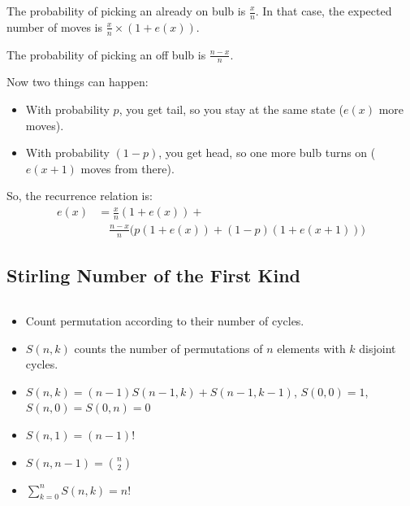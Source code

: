 {\begin{itemize}
{    The probability of picking an already on bulb is $\frac{x}{n}$.
    In that case, the expected number of moves is $\frac{x}{n} \times (1 + e(x))$.

    The probability of picking an off bulb is $\frac{n-x}{n}$.

    \par
    Now two things can happen:
    \begin{itemize}
        \item With probability $p$, you get tail, so you stay at the same state ($e(x)$ more moves).
        \item With probability $(1-p)$, you get head, so one more bulb turns on ($e(x+1)$ moves from there).
    \end{itemize}

    \par
    So, the recurrence relation is:
    \begin{align*}
    e(x) &= \frac{x}{n} (1 + e(x)) + \\
         & \quad \frac{n-x}{n} \big( p(1 + e(x)) + (1-p)(1 + e(x+1)) \big)
    \end{align*}
}
\end{itemize}
}


\subsection{\small Stirling Number of the First Kind  \scriptsize}
\inputminted[breaklines, breakanywhere]{c++}{code/04-Combinatorics and Probability/18-Stirling Number of the First Kind.cpp}

{\footnotesize
\begin{itemize}
    \item Count permutation according to their number of cycles.

    \item $S(n,k)$ counts the number of permutations of $n$ elements with $k$ disjoint cycles.

    \item $S(n,k) = (n-1) S(n-1,k) + S(n-1,k-1)$,\quad
          $S(0,0)=1$, \ $S(n,0)=S(0,n)=0$

    \item $S(n,1) = (n-1)!$

    \item $S(n,n-1) = \binom{n}{2}$

    \item $\displaystyle \sum_{k=0}^{n} S(n,k) = n!$
\end{itemize}
}

